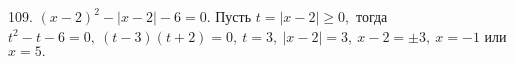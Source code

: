 109. $(x-2)^2-|x-2|-6=0.$ Пусть $t=|x-2|\geqslant 0,$ тогда $t^2-t-6=0,\ (t-3)(t+2)=0,\ t=3,\ |x-2|=3,\ x-2=\pm3,\ x=-1$ или $x=5.$\\
